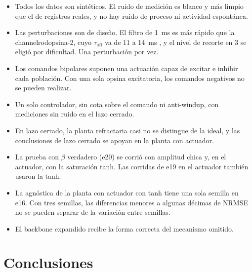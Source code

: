 \documentclass[11pt,a4paper]{article}
\begin{document}
\begin{itemize}[leftmargin=*,itemsep=0.25em]
\item Todos los datos son sintéticos. El ruido de medición es blanco y más limpio que el de registros reales, y no hay ruido de proceso ni actividad espontánea.
\item Las perturbaciones son de diseño. El filtro de 1~ms es más rápido que la channelrodopsina-2, cuyo $\tau_{\text{off}}$ va de 11 a 14~ms \cite{williams2013}, y el nivel de recorte en 3 se eligió por dificultad. Una perturbación por vez.
\item Los comandos bipolares suponen una actuación capaz de excitar e inhibir cada población. Con una sola opsina excitatoria, los comandos negativos no se pueden realizar.
\item Un solo controlador, sin cota sobre el comando ni anti-windup, con mediciones sin ruido en el lazo cerrado.
\item En lazo cerrado, la planta refractaria casi no se distingue de la ideal, y las conclusiones de lazo cerrado se apoyan en la planta con actuador.
\item La prueba con $\beta$ verdadero (e20) se corrió con amplitud chica y, en el actuador, con la saturación tanh. Las corridas de e19 en el actuador también usaron la tanh.
\item La agnóstica de la planta con actuador con tanh tiene una sola semilla en e16. Con tres semillas, las diferencias menores a algunas décimas de NRMSE no se pueden separar de la variación entre semillas.
\item El backbone expandido recibe la forma correcta del mecanismo omitido.
\end{itemize}

\section{Conclusiones}
\end{document}
